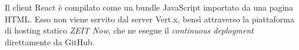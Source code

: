     Il client React è compilato come un bundle JavaScript importato da una pagina HTML\@.
    Esso non viene servito dal server Vert.x, bensì attraverso la piattaforma di hosting statico \emph{ZEIT Now}, che ne esegue il \emph{continuous deployment} direttamente da GitHub.




